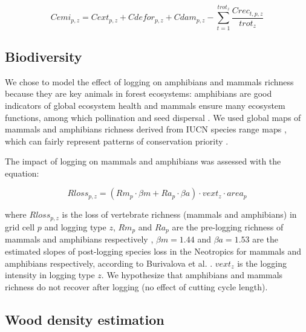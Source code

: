\documentclass{article}
\begin{document}
\begin{equation}
\label{eq:cemi}
    Cemi_{p,z} = Cext_{p,z} + Cdefor_{p,z} + Cdam_{p,z} -  \sum_{t=1}^{trot_z} \frac{Crec_{t,p,z}}{trot_z} 
\end{equation}

\subsection{Biodiversity}

We chose to model the effect of logging on amphibians and mammals richness because they are key animals in forest ecosystems: amphibians are good indicators of global ecosystem health \cite{Welsh1998,Collins2003} and mammals ensure many ecosystem functions, among which pollination \cite{Fleming2009} and seed dispersal \cite{Wright2000,Muscarella2007}. We used global maps of mammals and amphibians richness derived from IUCN species range maps \cite{Jenkins2013,MapBiodiv}, which can fairly represent patterns of conservation priority \cite{Marechaux2017}.

The impact of logging on mammals and amphibians was assessed with the equation: 

\begin{equation}
\label{eq:rloss}
Rloss_{p,z} = \left(Rm_{p} \cdot \beta m + Ra_{p} \cdot \beta a  \right)  \cdot vext_z \cdot area_p 
\end{equation}

where $Rloss_{p,z}$ is the loss of vertebrate richness (mammals and amphibians) in grid cell $p$ and logging type $z$, $Rm_{p}$ and $Ra_p$ are the pre-logging richness of mammals and amphibians respectively \cite{Jenkins2013}, $\beta m = 1.44$ and $\beta a = 1.53$  are the estimated slopes of post-logging species loss in the Neotropics for mammals and amphibians respectively, according to Burivalova et al.  \cite{Burivalova2014}. $vext_z$ is the logging intensity in logging type $z$.
We hypothesize that amphibians and mammals richness do not recover after logging (no effect of cutting cycle length). 

\subsection{Wood density estimation}
\label{supmat:wdext}
\end{document}
